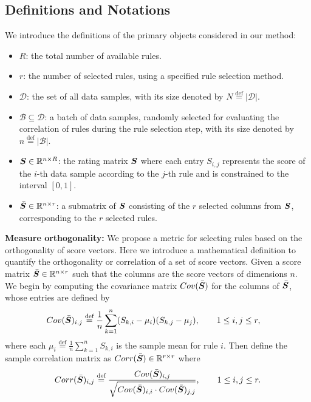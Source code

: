 \documentclass{article}
\newcommand{\bydef}{\stackrel{\text{def}}{=}}
\newcommand{\bmS}{\bar{\mS}}
\begin{document}
\subsection{Definitions and Notations}\label{subsec:DefinitionsNotations}
We introduce the definitions of the primary objects considered in our method:
\begin{itemize}
\item $R$: the total number of available rules.
\item $r$: the number of selected rules, using a specified rule selection method.
\item $\mathcal{D}$: the set of all data samples, with its size denoted by $N \bydef |\mathcal{D}|$.
\item $\mathcal{B} \subseteq \mathcal{D}$: a batch of data samples, randomly selected for evaluating the correlation of rules during the rule selection step, with its size denoted by $n \bydef |\mathcal{B}|$.
\item ${\bm{S}} \in \mathbb{R}^{n \times R}$: the rating matrix ${\bm{S}}$ where each entry $S_{i,j}$ represents the score of the $i$-th data sample according to the $j$-th rule and is constrained to the interval $[0,1]$.
\item $\bmS \in \R^{n \times r}$: a submatrix of ${\bm{S}}$ consisting of the $r$ selected columns from ${\bm{S}}$, corresponding to the $r$ selected rules. 
\end{itemize}




\textbf{Measure orthogonality:}
We propose a metric for selecting rules based on the orthogonality of score vectors. Here we introduce a mathematical definition to quantify the orthogonality or correlation of a set of score vectors. Given a score matrix  $\bmS \in \R^{n \times r}$ such that the columns are the score vectors of dimensions $n$. We begin by computing the covariance matrix $Cov(\bmS)$ for the columns of  $\bmS$, whose entries are defined by
\begin{align*}
    &Cov(\bmS)_{i,j} \bydef  \frac{1}{n} \sum_{k=1}^n (S_{k,i}-\mu_i)(S_{k,j}-\mu_j), \qquad 1\leq i,j \leq r,
\end{align*}
where each $\mu_i \bydef \frac{1}{n} \sum_{k=1}^n S_{k,i}$ is the sample mean for rule $i$. Then define the sample correlation matrix as $Corr(\bmS) \in \R^{r \times r}$ where
\begin{align*}
    Corr(\bmS)_{i,j} \bydef  \frac{Cov(\bmS)_{i,j}}{\sqrt{Cov(\bmS)_{i,i} \cdot Cov(\bmS)_{j,j}}}, \qquad 1\leq i,j \leq r.
\end{align*}
\end{document}
